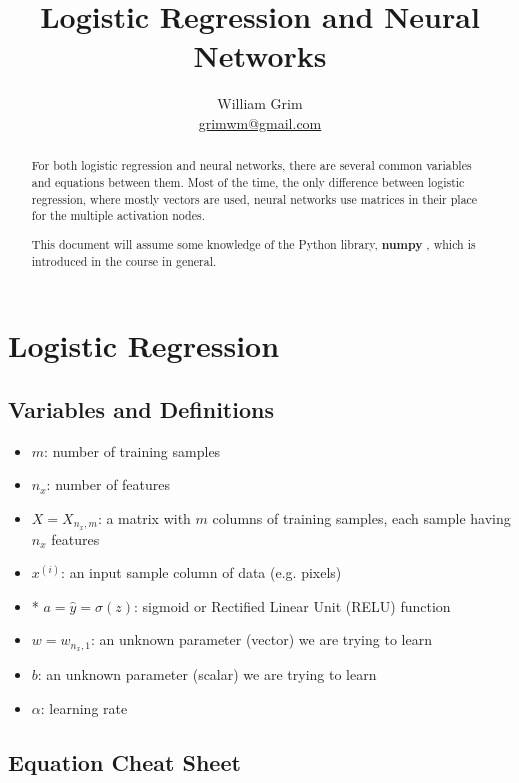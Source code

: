 \documentclass{article}
\begin{document}
\title{Logistic Regression and Neural Networks}
\author{William Grim \\ \href{mailto:grimwm@gmail.com}{grimwm@gmail.com}}

\maketitle

\tableofcontents

\begin{abstract}
For both logistic regression and neural networks, there are several common variables and equations between them.  Most of the time, the only difference between logistic regression, where mostly vectors are used, neural networks use matrices in their place for the multiple activation nodes.

This document will assume some knowledge of the Python library, \textbf{numpy} , which is introduced in the course in general.
\end{abstract}

\section{Logistic Regression}

\subsection{Variables and Definitions}

\begin{itemize}
\item $m$: number of training samples
\item $n_x$: number of features
\item $X = X_{n_x,m}$: a matrix with $m$ columns of training samples, each sample having $n_x$ features
\item $x^{(i)}$: an input sample column of data (e.g. pixels)
\item* $a = \hat{y} = \sigma(z)$: sigmoid or Rectified Linear Unit (RELU) function
\item $w = w_{n_x,1}$: an unknown parameter (vector) we are trying to learn
\item $b$: an unknown parameter (scalar) we are trying to learn
\item $\alpha$: learning rate
\end{itemize}

\subsection{Equation Cheat Sheet}
\end{document}

